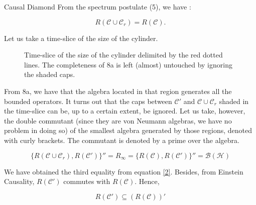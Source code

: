 \documentclass[12pt]{article}
\begin{document}
\begin{section}{Causal Diamond}
From the spectrum postulate (5), we have \cite{borchers_uber_1961}:

\begin{equation}\label{2}
R(\mathcal{C} \cup \mathcal{C}_r) = R(\mathcal{C}).
\end{equation}

Let us take a time-slice of the size of the cylinder.

\begin{figure}[H]
\centering
{}
\caption{Time-slice of the size of the cylinder delimited by the red dotted lines. The completeness of 8a is left (almost) untouched by ignoring the shaded caps.}
\label{time-slice}
\end{figure}

From 8a, we have that the algebra located in that region generates all the bounded operators. It turns out \cite{haag_postulates_1962} that the caps between $\mathcal{C}'$ and $\mathcal{C} \cup \mathcal{C}_r$ shaded in the time-slice can be, up to a certain extent, be ignored. Let us take, however, the double commutant (since they are von Neumann algebras, we have no problem in doing so) of the smallest algebra generated by those regions, denoted with curly brackets. The commutant is denoted by a prime over the algebra.

\begin{equation}\label{3}
\{R(\mathcal{C} \cup \mathcal{C}_r),R(\mathcal{C}') \}'' = R_\infty = \{R(\mathcal{C}),R(\mathcal{C}') \}'' = \mathcal{B}(\mathcal{H})
\end{equation}

We have obtained the third equality from equation \ref{2}. Besides, from Einstein Causality, $R(\mathcal{C}')$ commutes with $R(\mathcal{C})$. Hence,

\begin{equation}\label{4}
R(\mathcal{C}') \subseteq (R(\mathcal{C}))'
\end{equation}


\end{section}
\end{document}

